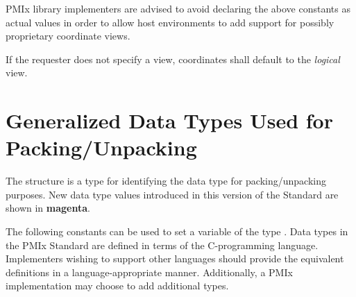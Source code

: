 \adviceimplstart
\ac{PMIx} library implementers are advised to avoid declaring the above constants as actual  values in order to allow host environments to add support for possibly proprietary coordinate views.
\adviceimplend

If the requester does not specify a view, coordinates shall default to the \emph{logical} view.

\section{Generalized Data Types Used for Packing/Unpacking}

The  structure is a  type for identifying the data type for packing/unpacking purposes. New data type values introduced in this version of the Standard are shown in \textbf{\color{magenta}magenta}.

\adviceimplstart
The following constants can be used to set a variable of the type . Data types in the \ac{PMIx} Standard are defined in terms of the C-programming language. Implementers wishing to support other languages should provide the equivalent definitions in a language-appropriate manner. Additionally, a PMIx implementation may choose to add additional types.
\adviceimplend

